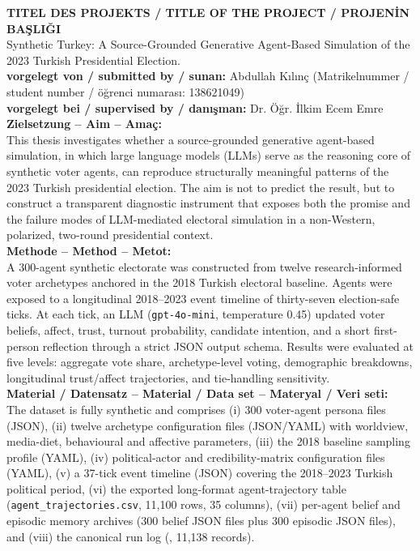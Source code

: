 \documentclass[12pt,a4paper]{report}
\begin{document}
\noindent\textbf{TITEL DES PROJEKTS / TITLE OF THE PROJECT / PROJENİN BAŞLIĞI}\\[0.2cm]
Synthetic Turkey: A Source-Grounded Generative Agent-Based Simulation of the 2023 Turkish Presidential Election.\\[0.4cm]

\noindent\textbf{vorgelegt von / submitted by / sunan:} Abdullah Kılınç (Matrikelnummer / student number / öğrenci numarası: 138621049)\\
\textbf{vorgelegt bei / supervised by / danışman:} Dr. Öğr. İlkim Ecem Emre\\[0.4cm]

\noindent\textbf{Zielsetzung – Aim – Amaç:}\\
This thesis investigates whether a source-grounded generative agent-based simulation, in which large language models (LLMs) serve as the reasoning core of synthetic voter agents, can reproduce structurally meaningful patterns of the 2023 Turkish presidential election. The aim is not to predict the result, but to construct a transparent diagnostic instrument that exposes both the promise and the failure modes of LLM-mediated electoral simulation in a non-Western, polarized, two-round presidential context.\\[0.3cm]

\noindent\textbf{Methode – Method – Metot:}\\
A 300-agent synthetic electorate was constructed from twelve research-informed voter archetypes anchored in the 2018 Turkish electoral baseline. Agents were exposed to a longitudinal 2018--2023 event timeline of thirty-seven election-safe ticks. At each tick, an LLM (\texttt{gpt-4o-mini}, temperature 0.45) updated voter beliefs, affect, trust, turnout probability, candidate intention, and a short first-person reflection through a strict JSON output schema. Results were evaluated at five levels: aggregate vote share, archetype-level voting, demographic breakdowns, longitudinal trust/affect trajectories, and tie-handling sensitivity.\\[0.3cm]

\noindent\textbf{Material / Datensatz – Material / Data set – Materyal / Veri seti:}\\
The dataset is fully synthetic and comprises (i) 300 voter-agent persona files (JSON), (ii) twelve archetype configuration files (JSON/YAML) with worldview, media-diet, behavioural and affective parameters, (iii) the 2018 baseline sampling profile (YAML), (iv) political-actor and credibility-matrix configuration files (YAML), (v) a 37-tick event timeline (JSON) covering the 2018--2023 Turkish political period, (vi) the exported long-format agent-trajectory table (\texttt{agent\_trajectories.csv}, 11{,}100 rows, 35 columns), (vii) per-agent belief and episodic memory archives (300 belief JSON files plus 300 episodic JSON files), and (viii) the canonical run log (, 11{,}138 records).\\[0.3cm]
\end{document}
